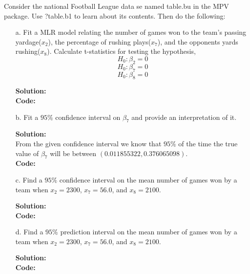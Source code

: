 \documentclass[12pt]{article}
\makeatletter
\theoremstyle{homework}
\newenvironment{exercise}[1]
{\def\@currentlabel{#1}\exercisecore}
{\endexercisecore}
\newcommand{\localhead}[1]{\par\smallskip\noindent\textbf{#1}\nobreak\\}%
\newcommand\solution{\localhead{Solution:}}
\makeatother
\begin{document}
\begin{exercise}{1}Consider the national Football League data se named table.bu in the MPV package. 
  Use ?table.b1 to learn about its contents. Then do the following:

  \begin{enumerate}
    \item[a.] Fit a MLR model relating the number of games won to the team's passing yardage($x_2$),
    the percentage of rushing plays($x_7$), and the opponents yards rushing($x_8$). Calculate t-statistics for testing the hypothesis, 
    \begin{equation*}
      H_0: \beta_2 = 0
    \end{equation*} 
    \begin{equation*}
      H_0: \beta_7 = 0
    \end{equation*} 
    \begin{equation*}
      H_0: \beta_8 = 0
    \end{equation*} 
    \solution 
     \textbf{Code:}
     \begin{center}
     
     \end{center} 
     \newpage

     \item[b.] Fit a $95\%$ confidence interval on $\beta_7$ and provide an interpretation of it. \\
    \solution From the given confidence interval we know that $95\%$ of the time the true value of $\beta_7$
    will be between $(0.011855322,0.376065098)$.\\
     \textbf{Code:}
     \begin{center}
     
     \end{center} 
     \newpage

     \item[c.] Find a $95\%$ confidence interval on the mean number of games won by a team when $x_2 = 2300$,
     $x_7 = 56.0$, and $x_8 = 2100$.\\
     \solution
     \textbf{Code:}
     \begin{center}
     
     \end{center} 
     \newpage

     \item[d.] Find a $95\%$ prediction interval on the mean number of games won by a team when $x_2 = 2300$,
     $x_7 = 56.0$, and $x_8 = 2100$.\\
     \solution
     \textbf{Code:}
     \begin{center}
     
     \end{center} 
  \end{enumerate}
\end{exercise}
\end{document}
